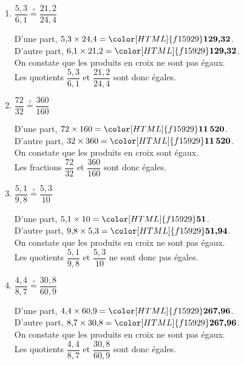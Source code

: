 \begin{corrige}
    \begin{enumerate}
        \item $\dfrac{5{,}3}{6{,}1}\overset{?}{=}\dfrac{21{,}2}{24{,}4}$\par
        D'une part, $5{,}3\times 24{,}4 = {\color[HTML]{f15929}\boldsymbol{129{,}32}}$.\\
                    D'autre part, $6{,}1\times 21{,}2 = {\color[HTML]{f15929}\boldsymbol{129{,}32}}$.\\
                    On constate que les produits en croix ne sont pas égaux.\\
                    Les quotients $\dfrac{5{,}3}{6{,}1}$ et $\dfrac{21{,}2}{24{,}4}$ sont donc égales.
        \item $\dfrac{72}{32}\overset{?}{=}\dfrac{360}{160}$\par
        D'une part, $72\times 160 = {\color[HTML]{f15929}\boldsymbol{11\,520}}$.\\
                    D'autre part, $32\times 360 = {\color[HTML]{f15929}\boldsymbol{11\,520}}$.\\
                    On constate que les produits en croix sont égaux.\\
                    Les fractions $\dfrac{72}{32}$ et $\dfrac{360}{160}$ sont donc égales.
    \end{enumerate}
    \Coupe
    \begin{enumerate}
        \setcounter{enumi}{2}
        \item $\dfrac{5{,}1}{9{,}8}\overset{?}{=}\dfrac{5{,}3}{10}$\par
        D'une part, $5{,}1\times 10 = {\color[HTML]{f15929}\boldsymbol{51}}$.\\
                    D'autre part, $9{,}8\times 5{,}3 = {\color[HTML]{f15929}\boldsymbol{51{,}94}}$.\\
                    On constate que les produits en croix ne sont pas égaux.\\
                    Les quotients $\dfrac{5{,}1}{9{,}8}$ et $\dfrac{5{,}3}{10}$ ne sont donc pas égales.
        \item $\dfrac{4{,}4}{8{,}7}\overset{?}{=}\dfrac{30{,}8}{60{,}9}$\par
        D'une part, $4{,}4\times 60{,}9 = {\color[HTML]{f15929}\boldsymbol{267{,}96}}$.\\
                    D'autre part, $8{,}7\times 30{,}8 = {\color[HTML]{f15929}\boldsymbol{267{,}96}}$.\\
                    On constate que les produits en croix ne sont pas égaux.\\
                    Les quotients $\dfrac{4{,}4}{8{,}7}$ et $\dfrac{30{,}8}{60{,}9}$ sont donc égales.
        \end{enumerate}
\end{corrige}


